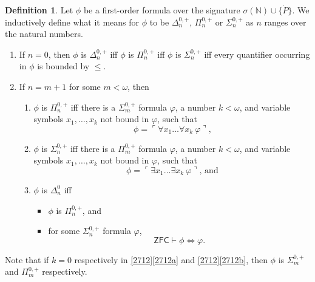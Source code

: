 \documentclass[12pt, twoside]{memoir}
\numberwithin{equation}{section}
\theoremstyle{definition}
\newtheorem{defi}[thm]{Definition}
\theoremstyle{remark}
\theoremstyle{definition}
\theoremstyle{definition}
\theoremstyle{definition}
\theoremstyle{remark}
\begin{document}
\begin{defi}
Let $\phi$ be a first-order formula over the signature $\sigma(\mathbb{N}) \cup \{\dot{P}\}$. We inductively define what it means for $\phi$ to be $\Delta^{0,+}_n$, $\Pi^{0, +}_n$ or $\Sigma^{0, +}_n$ as $n$ ranges over the natural numbers.
\begin{enumerate}[label=(\arabic*)]
    \item If $n = 0$, then $\phi$ is $\Delta^{0, +}_n$ iff $\phi$ is $\Pi^{0, +}_n$ iff $\phi$ is $\Sigma^{0, +}_n$ iff every quantifier occurring in $\phi$ is bounded by $\leq$.
    \item If $n = m + 1$ for some $m < \omega$, then 
    \begin{enumerate}[label=(\alph*)]
        \item $\phi$ is $\Pi^{0, +}_n$ iff there is a $\Sigma^{0, +}_m$ formula $\varphi$, a number $k < \omega$, and variable symbols $x_1, \dots, x_k$ not bound in $\varphi$, such that 
        \begin{equation*}
            \phi = \ulcorner \forall x_1 \dots \forall x_k \ \varphi \urcorner \text{,}
        \end{equation*}
        \item $\phi$ is $\Sigma^{0, +}_n$ iff there is a $\Pi^{0, +}_m$ formula $\varphi$, a number $k < \omega$, and variable symbols $x_1, \dots, x_k$ not bound in $\varphi$, such that 
        \begin{equation*}
            \phi = \ulcorner \exists x_1 \dots \exists x_k \ \varphi \urcorner \text{, and}
        \end{equation*}
        \item $\phi$ is $\Delta^0_n$ iff 
        \begin{itemize}[label=$\circ$]
            \item $\phi$ is $\Pi^{0, +}_n$, and
            \item for some $\Sigma^{0, +}_n$ formula $\varphi$,
            \begin{equation*}
                \mathsf{ZFC} \vdash \phi \iff \varphi \text{.}
            \end{equation*}
        \end{itemize}
    \end{enumerate}
\end{enumerate}
Note that if $k = 0$ respectively in \ref{2712}\ref{2712a} and \ref{2712}\ref{2712b}, then $\phi$ is $\Sigma^{0, +}_m$ and $\Pi^{0, +}_m$ respectively.
\end{defi}
\end{document}
